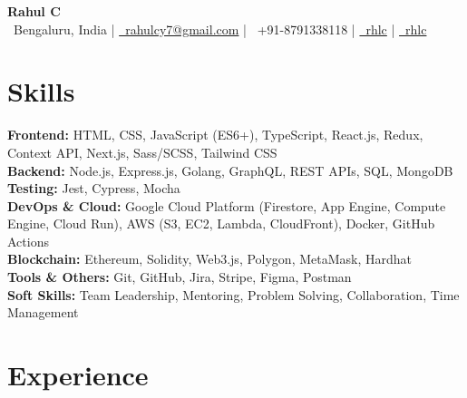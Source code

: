 \documentclass[10pt, letterpaper]{article}
\newenvironment{onecolentry}{
    \begin{adjustwidth}{0.2 cm}{0.2 cm}
}{
    \end{adjustwidth}
}
\begin{document}
\begin{center}
    {\fontsize{20pt}{20pt}\selectfont \textbf{Rahul C}}\\
    \vspace{0.15cm}
    {\faMapMarker*~Bengaluru, India \quad|\quad
     \href{mailto:rahulcy7@gmail.com}{\faEnvelope[regular]~rahulcy7@gmail.com} \quad|\quad
     \faPhone*~+91-8791338118 \quad|\quad
     \href{https://linkedin.com/in/rhlc}{\faLinkedinIn~rhlc} \quad|\quad
     \href{https://github.com/rhlc}{\faGithub~rhlc}}
\end{center}

\section{Skills}
\begin{onecolentry}
\textbf{Frontend:} HTML, CSS, JavaScript (ES6+), TypeScript, React.js, Redux, Context API, Next.js, Sass/SCSS, Tailwind CSS \\
\textbf{Backend:} Node.js, Express.js, Golang, GraphQL, REST APIs, SQL, MongoDB \\
\textbf{Testing:} Jest, Cypress, Mocha \\
\textbf{DevOps & Cloud:} Google Cloud Platform (Firestore, App Engine, Compute Engine, Cloud Run), AWS (S3, EC2, Lambda, CloudFront), Docker, GitHub Actions \\
\textbf{Blockchain:} Ethereum, Solidity, Web3.js, Polygon, MetaMask, Hardhat \\
\textbf{Tools & Others:} Git, GitHub, Jira, Stripe, Figma, Postman \\
\textbf{Soft Skills:} Team Leadership, Mentoring, Problem Solving, Collaboration, Time Management
\end{onecolentry}


\section{Experience}
\end{document}
